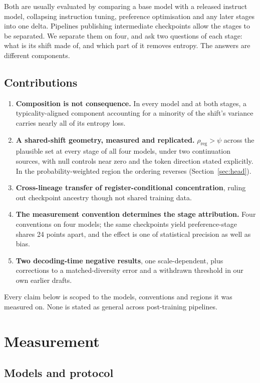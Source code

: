 \documentclass[11pt]{article}
\newcommand{\rreg}{\rho_{\mathrm{reg}}}
\begin{document}
Both are usually evaluated by comparing a base model with a released instruct
model, collapsing instruction tuning, preference optimisation and any later stages
into one delta. Pipelines publishing intermediate checkpoints allow the stages to
be separated. We separate them on four, and ask two questions of each stage: what
is its shift made of, and which part of it removes entropy. The answers are
different components.

\subsection{Contributions}

\begin{enumerate}
\item \textbf{Composition is not consequence.} In every model and at both stages, a
typicality-aligned component accounting for a minority of the shift's variance
carries nearly all of its entropy loss.
\item \textbf{A shared-shift geometry, measured and replicated.} $\rreg > \psi$
across the plausible set at every stage of all four models, under two continuation
sources, with null controls near zero and the token direction stated explicitly.
In the probability-weighted region the ordering reverses (Section~\ref{sec:head}).
\item \textbf{Cross-lineage transfer of register-conditional concentration},
ruling out checkpoint ancestry though not shared training data.
\item \textbf{The measurement convention determines the stage attribution.} Four
conventions on four models; the same checkpoints yield preference-stage shares 24
points apart, and the effect is one of statistical precision as well as bias.
\item \textbf{Two decoding-time negative results}, one scale-dependent, plus
corrections to a matched-diversity error and a withdrawn threshold in our own
earlier drafts.
\end{enumerate}

Every claim below is scoped to the models, conventions and regions it was measured
on. None is stated as general across post-training pipelines.

\section{Measurement}

\subsection{Models and protocol}
\end{document}
